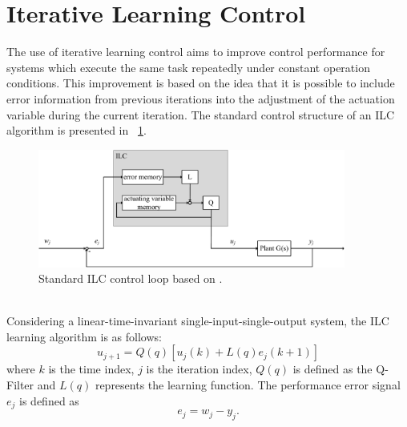 \section{Iterative Learning Control}
The use of iterative learning control aims to improve control performance for systems which execute the same task repeatedly under constant operation conditions. This improvement is based on the idea that it is possible to include error information from previous iterations into the adjustment of the actuation variable during the current iteration.
The standard control structure of an ILC algorithm is presented in \figurename~\ref{fig:ILC_only}.
\begin{figure}[h]
   \centering
   \includegraphics[width=0.9\textwidth]{images/ILC_only.pdf}
   \caption[Standard ILC control loop]{Standard ILC control loop based on \cite{ILC2}.}
   \label{fig:ILC_only}
 \end{figure}
\\Considering a linear-time-invariant single-input-single-output system, the ILC learning algorithm is as follows:
\begin{equation}
    u_{j+1}  = Q(q)[u_{j}(k)+L(q)e_{j}(k+1)]
 \label{eq:ILC_standard}
\end{equation}
where $k$ is the time index, $j$ is the iteration index, $Q(q)$ is defined as the Q-Filter and $L(q)$ represents the learning function. The performance error signal $e_{j}$ is defined as
\begin{equation}
    e_{j}  = w_{j}-y_{j}.
 \label{eq:perf_error}
\end{equation}

